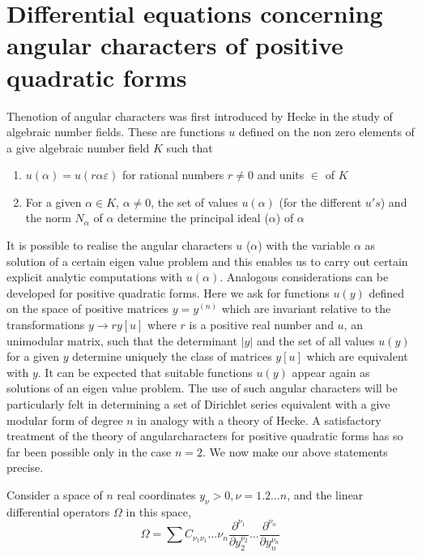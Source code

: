
\chapter[Differential equations concerning ....]{Differential equations concerning angular characters of
  positive quadratic forms}%


The\pageoriginale notion of angular characters was first introduced by
Hecke in the study of algebraic number fields. These are functions $u$
defined on the non zero elements of a give algebraic number field $K$
such that   
\begin{enumerate}
\item $u (\alpha) = u (r \alpha \varepsilon)$ for rational numbers $r
  \neq 0$ and units $\in$ of $K$ 

\item For a given $\alpha \in K$, $\alpha \neq 0$, the set of values $u
  (\alpha)$ (for the different $u's$) and the norm $N_\alpha$ of
  $\alpha$ determine the principal ideal ($\alpha$) of $\alpha$ 
\end{enumerate}

It is possible to realise the angular characters $u$ ($\alpha$) with
the variable $\alpha$ as solution of a certain eigen value problem and
this enables us to carry out certain explicit analytic computations
with $u(\alpha)$. Analogous considerations can be developed for
positive quadratic forms. Here we ask for functions $u (y)$ defined on
the space of positive matrices $y = y^{(n)}$ which are invariant
relative to the transformations $y \rightarrow r y[u]$ where $r$ is a
positive real number and $u$, an unimodular matrix, such that the
determinant $|y|$ and the set of all values $u(y)$ for a given $y$
determine uniquely the class  of matrices $y[u]$ which are equivalent
with $y$. It can be expected that suitable functions $u(y)$ appear
again as solutions of an eigen value problem. The use of such angular
characters will be particularly felt in determining a set of Dirichlet
series equivalent with a give modular form of degree $n$ in analogy with a
theory of Hecke. A satisfactory treatment of the theory of
angular\pageoriginale characters for positive quadratic forms has so
far been possible only in the case $n=2$. We now make our above
statements precise.  

Consider a space of $n$ real coordinates $y_\nu > 0, \nu = 1.2 \ldots
n$, and the linear differential operators $\Omega$ in this space, 
\begin{equation*}
\Omega = \sum C_{{\nu_1}{\nu_1}} \ldots \nu_n \frac{\partial
  ^{\nu_1}}{\partial y^{\nu_2}_2} \ldots \frac{\partial
  ^{\nu_n}}{\partial y^{\nu_n}_n} \tag{350}\label{eq350} 
\end{equation*}

